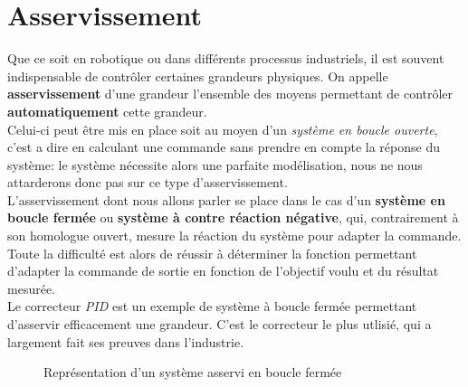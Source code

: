 \chapter{Asservissement}
    Que ce soit en robotique ou dans différents processus industriels, il est souvent indispensable de contrôler certaines grandeurs physiques.
    On appelle \textbf{asservissement} d'une grandeur l'ensemble des moyens permettant de contrôler \textbf{automatiquement} cette grandeur.\\
    Celui-ci peut être mis en place soit au moyen d'un \textit{système en boucle ouverte}, c'est a dire en calculant une commande sans prendre en compte la réponse du système: le système nécessite alors une parfaite modélisation, nous ne nous attarderons donc pas sur ce type d'asservissement.\\
    L'asservissement dont nous allons parler se place dans le cas d'un \textbf{système en boucle fermée} ou \textbf{système à contre réaction négative}, qui, contrairement à son homologue ouvert, mesure la réaction du système pour adapter la commande. Toute la difficulté est alors de réussir à déterminer la fonction permettant d'adapter la commande de sortie en fonction de l'objectif voulu et du résultat mesurée.\\
    Le correcteur \textit{PID} est un exemple de système à boucle fermée permettant d'asservir efficacement une grandeur. C'est le correcteur le plus utlisié, qui a largement fait ses preuves dans l'industrie.
    \begin{figure}[h]
        \centering
        
        \caption{Représentation d'un système asservi en boucle fermée}
    \end{figure}


    \newpage
